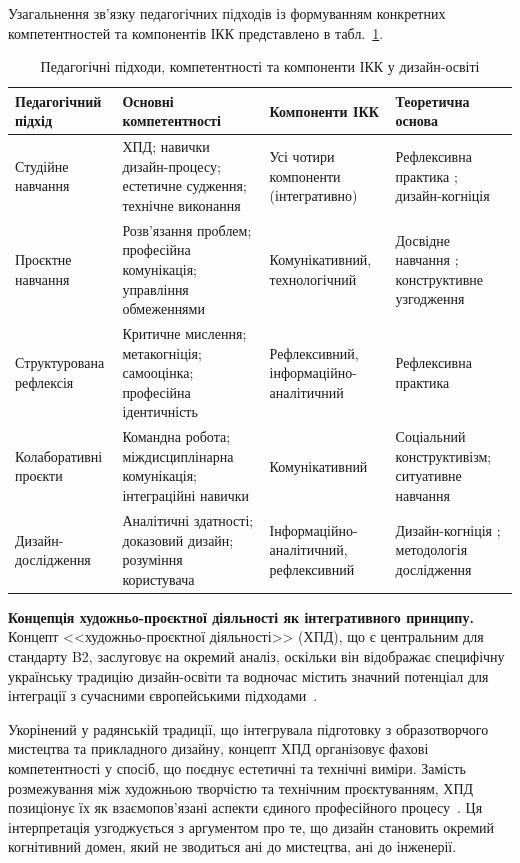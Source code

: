 Узагальнення зв'язку педагогічних підходів із формуванням конкретних компетентностей та компонентів ІКК представлено в табл.~\ref{tab:pedagogy-competency-ikk}.

\begin{table}[htbp]
\caption{Педагогічні підходи, компетентності та компоненти ІКК у дизайн-освіті}
\label{tab:pedagogy-competency-ikk}
\centering\small
\begin{tabularx}{\textwidth}{@{}p{2.8cm}Xp{2.5cm}p{2.5cm}@{}}
\toprule
\textbf{Педагогічний підхід} & \textbf{Основні компетентності} & \textbf{Компоненти ІКК} & \textbf{Теоретична основа} \\
\midrule
Студійне навчання & ХПД; навички дизайн-процесу; естетичне судження; технічне виконання & Усі чотири компоненти (інтегративно) & Рефлексивна практика \cite{Schon1983}; дизайн-когніція \cite{Cross2011} \\
\addlinespace
Проєктне навчання & Розв'язання проблем; професійна комунікація; управління обмеженнями & Комунікативний, технологічний & Досвідне навчання \cite{Kolb1984}; конструктивне узгодження \cite{Biggs1996} \\
\addlinespace
Структурована рефлексія & Критичне мислення; метакогніція; самооцінка; професійна ідентичність & Рефлексивний, інформаційно-аналітичний & Рефлексивна практика \cite{Schon1983, Hameed2023310} \\
\addlinespace
Колаборативні проєкти & Командна робота; міждисциплінарна комунікація; інтеграційні навички & Комунікативний & Соціальний конструктивізм; ситуативне навчання \\
\addlinespace
Дизайн-дослідження & Аналітичні здатності; доказовий дизайн; розуміння користувача & Інформаційно-аналітичний, рефлексивний & Дизайн-когніція \cite{Cross2011}; методологія дослідження \\
\bottomrule
\end{tabularx}
\end{table}

\textbf{Концепція художньо-проєктної діяльності як інтегративного принципу.} Концепт <<художньо-проєктної діяльності>> (ХПД), що є центральним для стандарту B2, заслуговує на окремий аналіз, оскільки він відображає специфічну українську традицію дизайн-освіти та водночас містить значний потенціал для інтеграції з сучасними європейськими підходами~\cite{Musiienko2025DesignEducation}.

Укорінений у радянській традиції, що інтегрувала підготовку з образотворчого мистецтва та прикладного дизайну, концепт ХПД організовує фахові компетентності у спосіб, що поєднує естетичні та технічні виміри. Замість розмежування між художньою творчістю та технічним проєктуванням, ХПД позиціонує їх як взаємопов'язані аспекти єдиного професійного процесу~\cite{Fursa2014}. Ця інтерпретація узгоджується з аргументом \citet{Cross2011} про те, що дизайн становить окремий когнітивний домен, який не зводиться ані до мистецтва, ані до інженерії.

